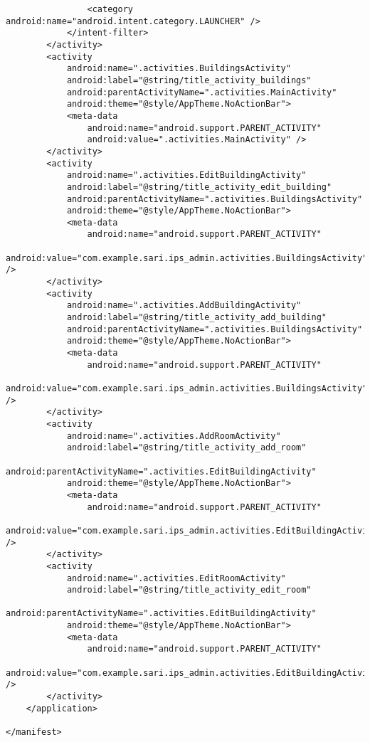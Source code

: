 \begin{lstlisting}
                <category android:name="android.intent.category.LAUNCHER" />
            </intent-filter>
        </activity>
        <activity
            android:name=".activities.BuildingsActivity"
            android:label="@string/title_activity_buildings"
            android:parentActivityName=".activities.MainActivity"
            android:theme="@style/AppTheme.NoActionBar">
            <meta-data
                android:name="android.support.PARENT_ACTIVITY"
                android:value=".activities.MainActivity" />
        </activity>
        <activity
            android:name=".activities.EditBuildingActivity"
            android:label="@string/title_activity_edit_building"
            android:parentActivityName=".activities.BuildingsActivity"
            android:theme="@style/AppTheme.NoActionBar">
            <meta-data
                android:name="android.support.PARENT_ACTIVITY"
                android:value="com.example.sari.ips_admin.activities.BuildingsActivity" />
        </activity>
        <activity
            android:name=".activities.AddBuildingActivity"
            android:label="@string/title_activity_add_building"
            android:parentActivityName=".activities.BuildingsActivity"
            android:theme="@style/AppTheme.NoActionBar">
            <meta-data
                android:name="android.support.PARENT_ACTIVITY"
                android:value="com.example.sari.ips_admin.activities.BuildingsActivity" />
        </activity>
        <activity
            android:name=".activities.AddRoomActivity"
            android:label="@string/title_activity_add_room"
            android:parentActivityName=".activities.EditBuildingActivity"
            android:theme="@style/AppTheme.NoActionBar">
            <meta-data
                android:name="android.support.PARENT_ACTIVITY"
                android:value="com.example.sari.ips_admin.activities.EditBuildingActivity" />
        </activity>
        <activity
            android:name=".activities.EditRoomActivity"
            android:label="@string/title_activity_edit_room"
            android:parentActivityName=".activities.EditBuildingActivity"
            android:theme="@style/AppTheme.NoActionBar">
            <meta-data
                android:name="android.support.PARENT_ACTIVITY"
                android:value="com.example.sari.ips_admin.activities.EditBuildingActivity" />
        </activity>
    </application>

</manifest>
\end{lstlisting}
\newpage
